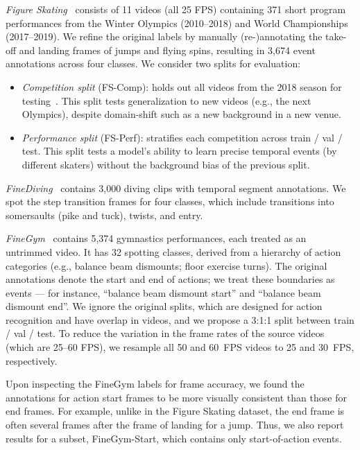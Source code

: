\documentclass[runningheads]{llncs}
\newcommand{\fscomp}{{FS-Comp}\xspace}
\newcommand{\fsperf}{{FS-Perf}\xspace}
\newcommand{\finegym}{{FineGym}\xspace}
\begin{document}
\textit{Figure Skating}~\cite{vpd} consists of 11 videos (all 25 FPS) containing 371 short program
performances from the Winter Olympics (2010--2018) and World Championships (2017--2019).
We refine the original labels by manually (re-)annotating the take-off and landing frames of jumps and flying spins, resulting in 3,674 event annotations across four classes.
We consider two splits for evaluation:
\begin{itemize}
    \item {\it Competition split} (\fscomp): holds out all videos from the 2018 season for testing~\cite{vpd}.
This split tests generalization to new videos (e.g., the next Olympics), despite domain-shift such as a new background in a new venue.
\item {\it Performance split} (\fsperf): stratifies each competition across train / val / test.
This split tests a model's ability to learn precise temporal events (by different skaters) without the background bias of the previous split.
\end{itemize}

\textit{FineDiving}~\cite{finediving} contains 3,000 diving clips with temporal segment annotations.
We spot the step transition frames for four classes, which include transitions into somersaults (pike and tuck), twists, and entry.

\textit{FineGym}~\cite{finegym} contains 5,374 gymnastics performances, each treated as an untrimmed video.
It has 32 spotting classes, derived from a hierarchy of action categories
(e.g., balance beam dismounts; floor exercise turns).
The original annotations denote the start and end of actions;
we treat these boundaries as events --- for instance, ``balance beam dismount start'' and ``balance beam dismount end''.
We ignore the original splits, which are designed for action recognition and have overlap in videos, and we propose a 3:1:1 split between train / val / test.
To reduce the variation in the frame rates of the source videos (which are 25--60 FPS), we resample all 50 and 60~FPS videos to 25 and 30~FPS, respectively.

Upon inspecting the \finegym labels for frame accuracy, we found the annotations for action start frames to be more visually consistent than those for end frames.
For example, unlike in the Figure Skating dataset, the end frame is often several frames after the frame of landing for a jump.
Thus, we also report results for a subset, \finegym-Start, which contains only start-of-action events.
 
\end{document}

